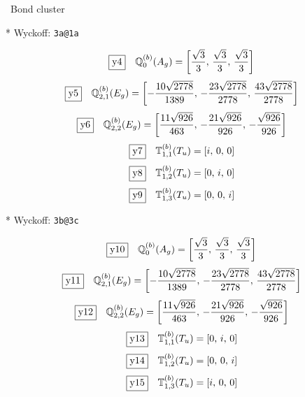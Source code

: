 \documentclass[fleqn,10pt,landscape]{jsarticle}
\begin{document}
\noindent\textbullet\, Bond cluster

\vspace{5mm}

\noindent ** Wyckoff: \texttt{3a@1a}

\begin{dmath*}
\fbox{y4}\quad \mathbb{Q}_{0}^{(b)}(A_{g})=\left[ \frac{\sqrt{3}}{3},\, \frac{\sqrt{3}}{3},\, \frac{\sqrt{3}}{3} \right]
\end{dmath*}
\begin{dmath*}
\fbox{y5}\quad \mathbb{Q}_{2,1}^{(b)}(E_{g})=\left[ - \frac{10 \sqrt{2778}}{1389},\, - \frac{23 \sqrt{2778}}{2778},\, \frac{43 \sqrt{2778}}{2778} \right]
\end{dmath*}
\begin{dmath*}
\fbox{y6}\quad \mathbb{Q}_{2,2}^{(b)}(E_{g})=\left[ \frac{11 \sqrt{926}}{463},\, - \frac{21 \sqrt{926}}{926},\, - \frac{\sqrt{926}}{926} \right]
\end{dmath*}
\begin{dmath*}
\fbox{y7}\quad \mathbb{T}_{1,1}^{(b)}(T_{u})=\left[ i,\, 0,\, 0 \right]
\end{dmath*}
\begin{dmath*}
\fbox{y8}\quad \mathbb{T}_{1,2}^{(b)}(T_{u})=\left[ 0,\, i,\, 0 \right]
\end{dmath*}
\begin{dmath*}
\fbox{y9}\quad \mathbb{T}_{1,3}^{(b)}(T_{u})=\left[ 0,\, 0,\, i \right]
\end{dmath*}
\vspace{5mm}

\noindent ** Wyckoff: \texttt{3b@3c}

\begin{dmath*}
\fbox{y10}\quad \mathbb{Q}_{0}^{(b)}(A_{g})=\left[ \frac{\sqrt{3}}{3},\, \frac{\sqrt{3}}{3},\, \frac{\sqrt{3}}{3} \right]
\end{dmath*}
\begin{dmath*}
\fbox{y11}\quad \mathbb{Q}_{2,1}^{(b)}(E_{g})=\left[ - \frac{10 \sqrt{2778}}{1389},\, - \frac{23 \sqrt{2778}}{2778},\, \frac{43 \sqrt{2778}}{2778} \right]
\end{dmath*}
\begin{dmath*}
\fbox{y12}\quad \mathbb{Q}_{2,2}^{(b)}(E_{g})=\left[ \frac{11 \sqrt{926}}{463},\, - \frac{21 \sqrt{926}}{926},\, - \frac{\sqrt{926}}{926} \right]
\end{dmath*}
\begin{dmath*}
\fbox{y13}\quad \mathbb{T}_{1,1}^{(b)}(T_{u})=\left[ 0,\, i,\, 0 \right]
\end{dmath*}
\begin{dmath*}
\fbox{y14}\quad \mathbb{T}_{1,2}^{(b)}(T_{u})=\left[ 0,\, 0,\, i \right]
\end{dmath*}
\begin{dmath*}
\fbox{y15}\quad \mathbb{T}_{1,3}^{(b)}(T_{u})=\left[ i,\, 0,\, 0 \right]
\end{dmath*}
\vspace{5mm}
\end{document}
